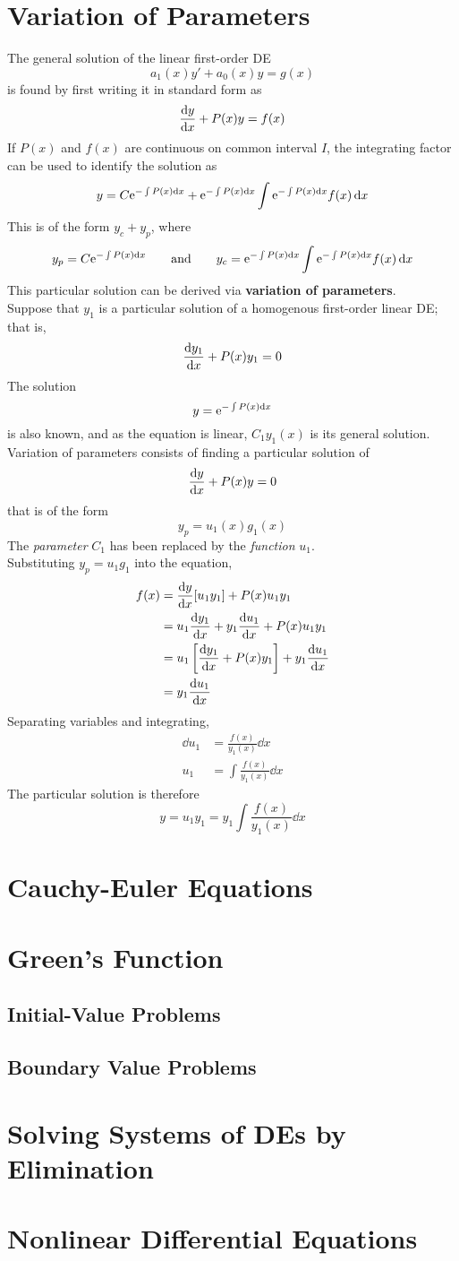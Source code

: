 \documentclass[./Differential Equations]{subfiles}
\begin{document}
	\section{Variation of Parameters}
			The general solution of the linear first-order DE
				\[a_1(x)y' + a_0(x)y = g(x)\]
				is found by first writing it in standard form as
				\[\dv{y}{x} + P(x)y = f(x)\]
				If \(P(x)\) and \(f(x)\) are continuous on common interval \(I\), the integrating factor can be used to identify the solution as
				\[y = C\text{e}^{-\int P(x) \dd{x}} + \text{e}^{-\int P(x) \dd{x}}\int \text{e}^{-\int P(x) \dd{x}}f(x) \dd{x}\]
				This is of the form \(y_c + y_p\), where
				\[
					y_p = C\text{e}^{-\int P(x)\dd{x}} \qquad \text{and} \qquad
						y_c = \text{e}^{-\int P(x)\dd{x}}\int\text{e}^{-\int P(x) \dd{x}}f(x) \dd{x}
				\]
				This particular solution can be derived via \textbf{variation of parameters}. \\
			Suppose that \(y_1\) is a particular solution of a homogenous first-order linear DE; that is,
				\[\dv{y_1}{x} + P(x)y_1 = 0\]
				The solution
				\[y = \text{e}^{-\int P(x) \dd{x}}\]
				is also known, and as the equation is linear, \(C_1y_1(x)\) is its general solution. Variation of parameters consists of finding a particular solution of				
				\[\dv{y}{x} + P(x)y = 0\]
				that is of the form
				\[y_p = u_1(x)g_1(x)\]
				The \textit{parameter} \(C_1\) has been replaced by the \textit{function} \(u_1\). \\
				Substituting \(y_p = u_1g_1\) into the equation,
				\begin{align*}
					f(x) &= \dv{y}{x}[u_1y_1] + P(x)u_1y_1 \\
						&= u_1\dv{y_1}{x} + y_1\dv{u_1}{x} + P(x)u_1y_1 \\
						&= u_1\left[\dv{y_1}{x} + P(x)y_1\right] + y_1\dv{u_1}{x} \\
						&= y_1\dv{u_1}{x}
				\end{align*}
				Separating variables and integrating,
				\begin{align*}
					\dd{u_1} &= \frac{f(x)}{y_1(x)} \dd{x} \\
					u_1 &= \int \frac{f(x)}{y_1(x)} \dd{x}
				\end{align*}
				The particular solution is therefore
				\[y = u_1y_1 = y_1\int \frac{f(x)}{y_1(x)} \dd{x}\]
	\section{Cauchy-Euler Equations}
	\section{Green's Function}
		\subsection{Initial-Value Problems}
		\subsection{Boundary Value Problems}
	\section{Solving Systems of DEs by Elimination}
	\section{Nonlinear Differential Equations}
\end{document}
